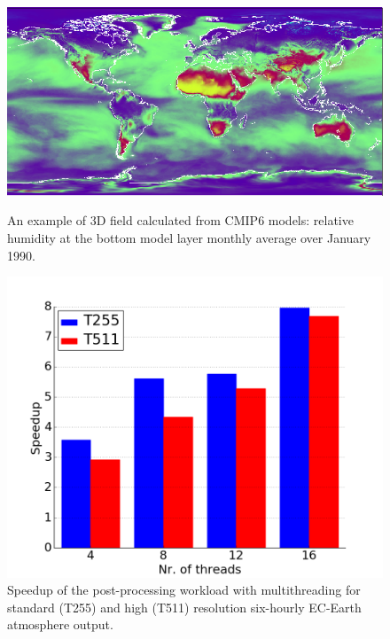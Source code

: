 \documentclass[procedia]{easychair}
\begin{document}
\begin{figure}[!t]
\centering
\begin{minipage}[b]{.45\textwidth}
  \centering
   \vspace*{1.5cm}
 \includegraphics[width=1\textwidth]{hur.png}
 \caption{An example of 3D field calculated from CMIP6 models: relative 
humidity at the bottom model layer monthly average over January 1990.}
\label{fig:hum}
\end{minipage}%
\hspace{0.6cm}
\begin{minipage}[b]{.45\textwidth}
  \centering
 \includegraphics[width=1\textwidth]{speedup_chart.png}
  \vspace*{-0.75cm}
 \caption{Speedup of the post-processing workload with multithreading for 
standard (T255) and high (T511) resolution six-hourly EC-Earth atmosphere 
output.}
\label{fig:speedup}
\end{minipage}
\end{figure}
\end{document}
